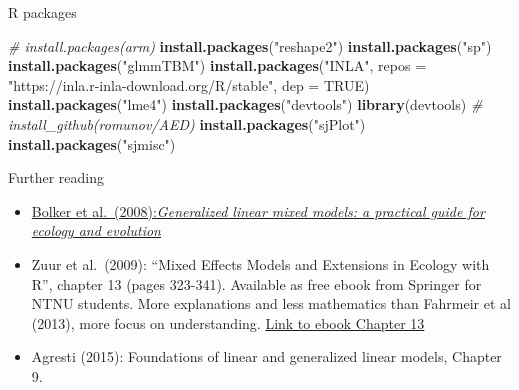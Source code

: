 \documentclass[
  ignorenonframetext,
]{beamer}
\newenvironment{Shaded}{\begin{snugshade}}{\end{snugshade}}
\newcommand{\AttributeTok}[1]{\textcolor[rgb]{0.13,0.29,0.53}{#1}}
\newcommand{\CommentTok}[1]{\textcolor[rgb]{0.56,0.35,0.01}{\textit{#1}}}
\newcommand{\ConstantTok}[1]{\textcolor[rgb]{0.56,0.35,0.01}{#1}}
\newcommand{\FunctionTok}[1]{\textcolor[rgb]{0.13,0.29,0.53}{\textbf{#1}}}
\newcommand{\NormalTok}[1]{#1}
\newcommand{\StringTok}[1]{\textcolor[rgb]{0.31,0.60,0.02}{#1}}
\providecommand{\tightlist}{%
  \setlength{\itemsep}{0pt}\setlength{\parskip}{0pt}}
\begin{document}
\begin{frame}[fragile]{R packages}
\protect{}\label{r-packages}
\begin{Shaded}
\begin{Highlighting}[]
\CommentTok{\# install.packages(\textquotesingle{}arm\textquotesingle{})}
\FunctionTok{install.packages}\NormalTok{(}\StringTok{"reshape2"}\NormalTok{)}
\FunctionTok{install.packages}\NormalTok{(}\StringTok{"sp"}\NormalTok{)}
\FunctionTok{install.packages}\NormalTok{(}\StringTok{"glmmTBM"}\NormalTok{)}
\FunctionTok{install.packages}\NormalTok{(}\StringTok{"INLA"}\NormalTok{, }\AttributeTok{repos =} \StringTok{"https://inla.r{-}inla{-}download.org/R/stable"}\NormalTok{, }\AttributeTok{dep =} \ConstantTok{TRUE}\NormalTok{)}
\FunctionTok{install.packages}\NormalTok{(}\StringTok{"lme4"}\NormalTok{)}
\FunctionTok{install.packages}\NormalTok{(}\StringTok{"devtools"}\NormalTok{)}
\FunctionTok{library}\NormalTok{(devtools)}
\CommentTok{\# install\_github(\textquotesingle{}romunov/AED\textquotesingle{})}
\FunctionTok{install.packages}\NormalTok{(}\StringTok{"sjPlot"}\NormalTok{)}
\FunctionTok{install.packages}\NormalTok{(}\StringTok{"sjmisc"}\NormalTok{)}
\end{Highlighting}
\end{Shaded}
\end{frame}

\begin{frame}{Further reading}
\protect{}\label{further-reading}
\begin{itemize}
\tightlist
\item
  \href{http://avesbiodiv.mncn.csic.es/estadistica/curso2011/regm26.pdf}{Bolker
  et al.~(2008):\emph{Generalized linear mixed models: a practical guide
  for ecology and evolution}}
\item
  Zuur et al.~(2009): ``Mixed Effects Models and Extensions in Ecology
  with R'', chapter 13 (pages 323-341). Available as free ebook from
  Springer for NTNU students. More explanations and less mathematics
  than Fahrmeir et al (2013), more focus on understanding.
  \href{https://link.springer.com/chapter/10.1007/978-0-387-87458-6_13}{Link
  to ebook Chapter 13}
\item
  Agresti (2015): Foundations of linear and generalized linear models,
  Chapter 9.
\end{itemize}
\end{frame}
\end{document}
